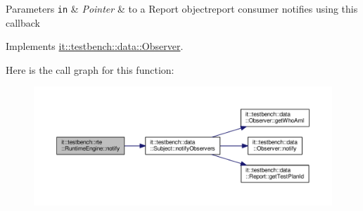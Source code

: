 \begin{DoxyParams}[1]{Parameters}
\mbox{\tt in}  & {\em Pointer} & to a Report objectreport consumer notifies using this callback \\
\hline
\end{DoxyParams}


Implements \hyperlink{classit_1_1testbench_1_1data_1_1Observer_a6658bb092e485bfe9edb7a9f27685a27}{it\-::testbench\-::data\-::\-Observer}.



Here is the call graph for this function\-:
\nopagebreak
\begin{figure}[H]
\begin{center}
\leavevmode
\includegraphics[width=350pt]{d9/d54/classit_1_1testbench_1_1rte_1_1RuntimeEngine_a9e1aaf1a127ea1f9242a4c67acbe70df_cgraph}
\end{center}
\end{figure}




